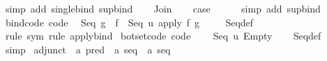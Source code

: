 \begin{isabellebody}
\ {\isacharparenleft}{\kern0pt}simp\ add{\isacharcolon}{\kern0pt}\ single{\isacharunderscore}{\kern0pt}bind\ sup{\isacharunderscore}{\kern0pt}bind{\isacharparenright}{\kern0pt}\isanewline
{}\isamarkupfalse%
\isanewline
\ \ \isamarkupfalse%
\ Join\ \isamarkupfalse%
\ \isamarkupfalse%
\ {\isacharquery}{\kern0pt}case\isanewline
\ \ \ \ \isamarkupfalse%
\ {\isacharparenleft}{\kern0pt}simp\ add{\isacharcolon}{\kern0pt}\ sup{\isacharunderscore}{\kern0pt}bind{\isacharparenright}{\kern0pt}\isanewline
{}\isamarkupfalse%
%
\endisatagproof
{\isafoldproof}%
%
\isadelimproof
\isanewline
%
\endisadelimproof
\ \ \isanewline
{}\isamarkupfalse%
\ bind{\isacharunderscore}{\kern0pt}code\ {\isacharbrackleft}{\kern0pt}code{\isacharbrackright}{\kern0pt}{\isacharcolon}{\kern0pt}\isanewline
\ \ {\isachardoublequoteopen}Seq\ g\ {\isasymbind}\ f\ {\isacharequal}{\kern0pt}\ Seq\ {\isacharparenleft}{\kern0pt}{\isasymlambda}u{\isachardot}{\kern0pt}\ apply\ f\ {\isacharparenleft}{\kern0pt}g\ {\isacharparenleft}{\kern0pt}{\isacharparenright}{\kern0pt}{\isacharparenright}{\kern0pt}{\isacharparenright}{\kern0pt}{\isachardoublequoteclose}\isanewline
%
\isadelimproof
\ \ %
\endisadelimproof
%
\isatagproof
{}\isamarkupfalse%
\ Seq{\isacharunderscore}{\kern0pt}def\ \isamarkupfalse%
\ {\isacharparenleft}{\kern0pt}rule\ sym{\isacharcomma}{\kern0pt}\ rule\ apply{\isacharunderscore}{\kern0pt}bind{\isacharparenright}{\kern0pt}%
\endisatagproof
{\isafoldproof}%
%
\isadelimproof
\isanewline
%
\endisadelimproof
\isanewline
{}\isamarkupfalse%
\ bot{\isacharunderscore}{\kern0pt}set{\isacharunderscore}{\kern0pt}code\ {\isacharbrackleft}{\kern0pt}code{\isacharbrackright}{\kern0pt}{\isacharcolon}{\kern0pt}\isanewline
\ \ {\isachardoublequoteopen}{\isasymbottom}\ {\isacharequal}{\kern0pt}\ Seq\ {\isacharparenleft}{\kern0pt}{\isasymlambda}u{\isachardot}{\kern0pt}\ Empty{\isacharparenright}{\kern0pt}{\isachardoublequoteclose}\isanewline
%
\isadelimproof
\ \ %
\endisadelimproof
%
\isatagproof
{}\isamarkupfalse%
\ Seq{\isacharunderscore}{\kern0pt}def\ \isamarkupfalse%
\ simp%
\endisatagproof
{\isafoldproof}%
%
\isadelimproof
\isanewline
%
\endisadelimproof
\isanewline
{}\isamarkupfalse%
\ adjunct\ {\isacharcolon}{\kern0pt}{\isacharcolon}{\kern0pt}\ {\isachardoublequoteopen}{\isacharprime}{\kern0pt}a\ pred\ {\isasymRightarrow}\ {\isacharprime}{\kern0pt}a\ seq\ {\isasymRightarrow}\ {\isacharprime}{\kern0pt}a\ seq{\isachardoublequoteclose}\ \isanewline

\end{isabellebody}

